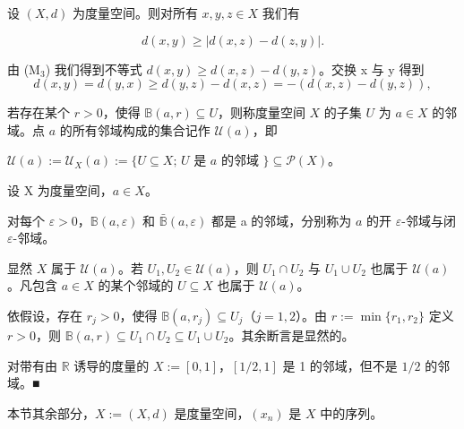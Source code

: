 \begin{proposition}

设  $ (X,d) $ 为度量空间。则对所有  $ x,y,z\in X $ 我们有

\[
d(x,y)\geq|d(x,z)-d(z,y)|.
\]

\proofhead
由 (M$_3$) 我们得到不等式  $ d(x, y) \geq d(x, z) - d(y, z) $。交换 x 与 y 得到
\[
d(x,y)=d(y,x)\geq d(y,z)-d(x,z)=-\left(d(x,z)-d(y,z)\right),
\]

若存在某个  $ r > 0 $，使得  $ \mathbb{B}(a, r) \subseteq U $，则称度量空间  $ X $ 的子集  $ U $ 为  $ a \in X $ 的邻域。点  $ a $ 的所有邻域构成的集合记作  $ \mathcal{U}(a) $，即

$ \mathcal{U}(a) := \mathcal{U}_X(a) := \{ U \subseteq X ; \, U \text{ 是 } a \text{ 的邻域 } \} \subseteq \mathcal{P}(X) $。

\end{proposition}

\begin{example}

设 X 为度量空间，$a\in X$。

\begin{items}
\item

对每个  $ \varepsilon > 0 $，$ \mathbb{B}(a, \varepsilon) $ 和  $ \bar{\mathbb{B}}(a, \varepsilon) $ 都是 a 的邻域，分别称为  $ a $ 的开  $ \varepsilon $-邻域与闭  $ \varepsilon $-邻域。

\item

显然 $X$ 属于 $\mathcal{U}(a)$。若 $U_1, U_2 \in \mathcal{U}(a)$，则 $U_1 \cap U_2$ 与 $U_1 \cup U_2$ 也属于 $\mathcal{U}(a)$。凡包含 $a \in X$ 的某个邻域的 $U \subseteq X$ 也属于 $\mathcal{U}(a)$。

\proofhead
依假设，存在  $ r_j > 0 $，使得  $ \mathbb{B}(a, r_j) \subseteq U_j $（$ j = 1, 2 $）。由  $ r := \min\{r_1, r_2\} $ 定义  $ r > 0 $，则  $ \mathbb{B}(a, r) \subseteq U_1 \cap U_2 \subseteq U_1 \cup U_2 $。其余断言是显然的。
\item

对带有由  $ \mathbb{R} $ 诱导的度量的  $ X := [0,1] $，$ [1/2,1] $ 是 1 的邻域，但不是  $ 1/2 $ 的邻域。■

\end{items}

本节其余部分，$X := (X, d)$ 是度量空间，$(x_n)$ 是 $X$ 中的序列。

\end{example}

